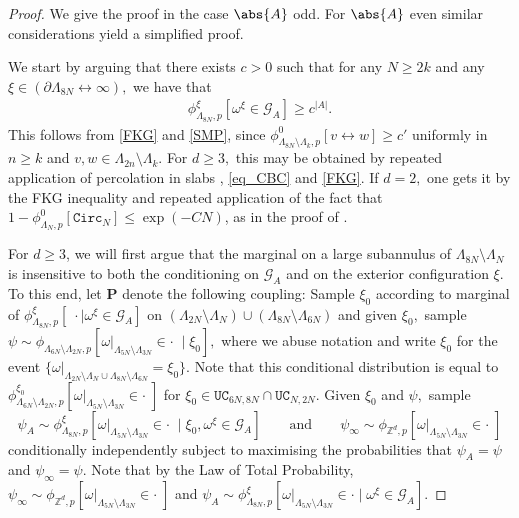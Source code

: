\documentclass[article,11pt,reqno]{amsart}
\newcommand{\cc}{\leftrightarrow}
\newcommand{\xiA}{\xi_0}
\begin{document}
\begin{proof}
We give the proof in the case $\abs{A}$ odd. For $\abs{A}$ even similar considerations yield a simplified proof. 

We start by arguing that there exists $c>0$ such that for any $N\geq 2k$ and any $\xi\in (\partial \Lambda_{8N}\cc \infty),$ we have that
\begin{align} \label{eq:GAprob_bound}
\phi^{\xi}_{\Lambda_{8N},p}[\omega^{\xi}\in\mathcal{G}_A]\geq c^{|A|}.
\end{align} 
This follows from \eqref{FKG} and \eqref{SMP},  since $\phi^0_{\Lambda_{8N}\setminus \Lambda_k,p}[v\cc w]\geq c'$ uniformly in $n \geq k$ and $v,w\in \Lambda_{2n}\setminus \Lambda_k$. For $d\geq 3,$ this may be obtained by repeated application of percolation in slabs , \eqref{eq_CBC} and \eqref{FKG}. If $d=2,$ one gets it by the FKG inequality and repeated application of the fact that $1-\phi^0_{\Lambda_N,p}[\mathtt{Circ}_N]\leq \exp(-CN)$, as in the proof of .

For $d\geq 3$, we will first argue that the marginal on a large subannulus of $\Lambda_{8N}\setminus \Lambda_N$ is insensitive to both the conditioning on $\mathcal{G}_A$ and on the exterior configuration $\xi.$ To this end, let $\boldsymbol{P}$ denote the following coupling: Sample $\xi_0$ according to marginal of $\phi^{\xi}_{\Lambda_{8N},p}[\;\cdot\mid \omega^{\xi}\in \mathcal{G}_A]$ on $(\Lambda_{2N}\setminus \Lambda_N)\cup(\Lambda_{8N}\setminus \Lambda_{6N})$ and given $\xi_0,$ sample $\psi\sim \phi_{\Lambda_{6N}\setminus \Lambda_{2N},p}[\omega|_{\Lambda_{5N}\setminus\Lambda_{3N}}\in \cdot\; \mid \xi_0],$ where we abuse notation and write $\xiA$ for the event $\{ \omega\vert_{\Lambda_{2N}\setminus \Lambda_{N} \cup \Lambda_{8N}\setminus \Lambda_{6N}}=\xiA\}.$  Note that this conditional distribution is equal to $\phi^{\xi_0}_{\Lambda_{6N}\setminus \Lambda_{2N},p}[\omega|_{\Lambda_{5N}\setminus\Lambda_{3N}}\in \cdot \;]$ for $\xi_0\in \mathtt{UC}_{6N,8N}\cap \mathtt{UC}_{N,2N}$. Given $\xi_0$ and $\psi,$ sample $$
\psi_A\sim\phi^{\xi}_{\Lambda_{8N},p}[\omega|_{\Lambda_{5N}\setminus \Lambda_{3N}}\in  \cdot\; \mid \xi_0,\omega^{\xi}\in \mathcal{G}_A] \qquad \mathrm{and} \qquad \psi_{\infty}\sim \phi_{\mathbb{Z}^d,p}[\omega|_{\Lambda_{5N}\setminus\Lambda_{3N}}\in \cdot\;]
$$ conditionally independently subject to maximising the probabilities that $\psi_A=\psi$ and $\psi_{\infty}=\psi$. Note that by the Law of Total Probability, $\psi_{\infty}\sim \phi_{\mathbb{Z}^d,p}[\omega|_{\Lambda_{5N}\setminus \Lambda_{3N}}\in \cdot\;] $ and $\psi_A\sim \phi^{\xi}_{\Lambda_{8N},p}[\omega|_{\Lambda_{5N}\setminus \Lambda_{3N}}\in \cdot\mid \omega^{\xi}\in \mathcal{G}_A]$.


\end{proof}
\end{document}
